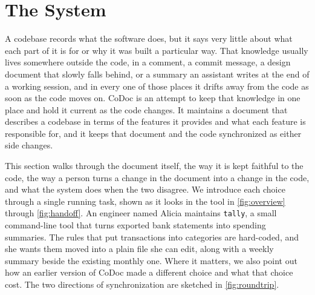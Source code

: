 
\DeclareRobustCommand{\mk}[1]{\tikz[baseline=(m.base)]{\node[circle,
  fill=codocann, text=white, inner sep=0.5pt, minimum size=1.7ex,
  font=\sffamily\bfseries\tiny] (m) {#1};}}

\section{The System}

A codebase records what the software does, but it says very little about what each part of it is for or why it was built a particular way.
That knowledge usually lives somewhere outside the code, in a comment, a commit message, a design document that slowly falls behind, or a summary an assistant writes at the end of a working session, and in every one of those places it drifts away from the code as soon as the code moves on.
CoDoc is an attempt to keep that knowledge in one place and hold it current as the code changes.
It maintains a document that describes a codebase in terms of the features it provides and what each feature is responsible for, and it keeps that document and the code synchronized as either side changes.

This section walks through the document itself, the way it is kept faithful to the code, the way a person turns a change in the document into a change in the code, and what the system does when the two disagree.
We introduce each choice through a single running task, shown as it looks in the tool in \autoref{fig:overview} through \autoref{fig:handoff}.
An engineer named Alicia maintains \texttt{tally}, a small command-line tool that turns exported bank statements into spending summaries.
The rules that put transactions into categories are hard-coded, and she wants them moved into a plain file she can edit, along with a weekly summary beside the existing monthly one.
Where it matters, we also point out how an earlier version of CoDoc made a different choice and what that choice cost.
The two directions of synchronization are sketched in \autoref{fig:roundtrip}.

